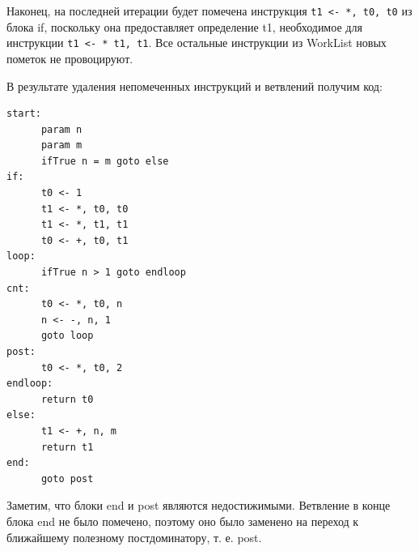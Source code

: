 \documentclass[11pt]{article}
\begin{document}
Наконец, на последней итерации будет помечена инструкция \texttt{t1 <- *, t0, t0} из блока if, поскольку она предоставляет определение t1, необходимое для инструкции \texttt{t1 <- * t1, t1}. Все остальные инструкции из WorkList новых пометок не провоцируют.

В результате удаления непомеченных инструкций и ветвлений получим код:
\begin{verbatim}
start:
      param n
      param m
      ifTrue n = m goto else
if:
      t0 <- 1
      t1 <- *, t0, t0
      t1 <- *, t1, t1
      t0 <- +, t0, t1
loop:
      ifTrue n > 1 goto endloop
cnt:
      t0 <- *, t0, n
      n <- -, n, 1
      goto loop
post:
      t0 <- *, t0, 2
endloop:
      return t0
else:
      t1 <- +, n, m
      return t1
end:
      goto post
\end{verbatim}
Заметим, что блоки end и post являются недостижимыми. Ветвление в конце блока end не было помечено, поэтому оно было заменено на переход к ближайшему полезному постдоминатору, т. е. post.
\end{document}
